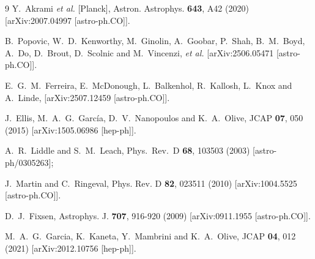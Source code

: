 \documentclass[aps,prev,twocolumn,preprintnumbers,floatfix,nofootinbib]{revtex4-1}
\begin{document}
\begin{thebibliography}{9}
Y.~Akrami \textit{et al.} [Planck],
Astron. Astrophys. \textbf{643}, A42 (2020)
[arXiv:2007.04997 [astro-ph.CO]].



B.~Popovic, W.~D.~Kenworthy, M.~Ginolin, A.~Goobar, P.~Shah, B.~M.~Boyd, A.~Do, D.~Brout, D.~Scolnic and M.~Vincenzi, \textit{et al.}
[arXiv:2506.05471 [astro-ph.CO]].




E.~G.~M.~Ferreira, E.~McDonough, L.~Balkenhol, R.~Kallosh, L.~Knox and A.~Linde,
[arXiv:2507.12459 [astro-ph.CO]].


J.~Ellis, M.~A.~G.~Garc{\' i}a, D.~V.~Nanopoulos and K.~A.~Olive,
JCAP \textbf{07}, 050 (2015)
[arXiv:1505.06986 [hep-ph]].


  A.~R.~Liddle and S.~M.~Leach,
  Phys.\ Rev.\ D {\bf 68}, 103503 (2003)
  [astro-ph/0305263];
  
J.~Martin and C.~Ringeval,
Phys. Rev. D \textbf{82}, 023511 (2010)
[arXiv:1004.5525 [astro-ph.CO]].

D.~J.~Fixsen,
Astrophys. J. \textbf{707}, 916-920 (2009)
[arXiv:0911.1955 [astro-ph.CO]].

M.~A.~G.~Garcia, K.~Kaneta, Y.~Mambrini and K.~A.~Olive,
JCAP \textbf{04}, 012 (2021)
[arXiv:2012.10756 [hep-ph]].


\end{thebibliography}
\end{document}
